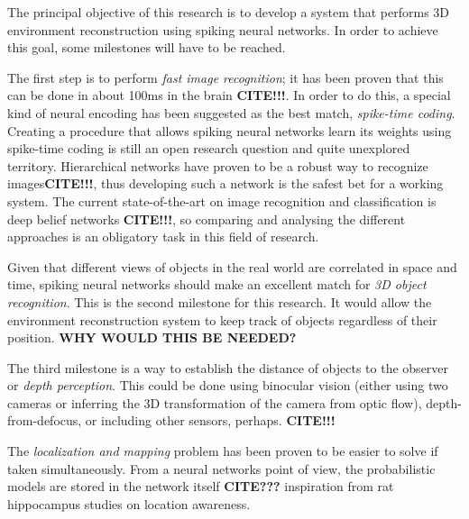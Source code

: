The principal objective of this research is to develop a system that performs 3D environment reconstruction using spiking neural networks. In order to achieve this goal, some milestones will have to be reached. 

The first step is to perform \emph{fast image recognition}; it has been proven that this can be done in about 100ms in the brain \textbf{CITE!!!}. In order to do this, a special kind of neural encoding has been suggested as the best match, \emph{spike-time coding}. Creating a procedure that allows spiking neural networks learn its weights using spike-time coding is still an open research question and quite unexplored territory. Hierarchical networks have proven to be a robust way to recognize images\textbf{CITE!!!}, thus developing such a network is the safest bet for a working system. The current state-of-the-art on image recognition and classification is deep belief networks \textbf{CITE!!!}, so comparing and analysing the different approaches is an obligatory task in this field of research. 

Given that different views of objects in the real world are correlated in space and time, spiking neural networks should make an excellent match for \emph{3D object recognition}. This is the second milestone for this research. It would allow the environment reconstruction system to keep track of objects regardless of their position. \textbf{WHY WOULD THIS BE NEEDED?}

The third milestone is a way to establish the distance of objects to the observer or \emph{depth perception}. This could be done using binocular vision (either using two cameras or inferring the 3D transformation of the camera from optic flow), depth-from-defocus, or including other sensors, perhaps. \textbf{CITE!!!}

The \emph{localization and mapping} problem has been proven to be easier to solve if taken simultaneously. From a neural networks point of view, the probabilistic models are stored in the network itself \textbf{CITE???} inspiration from rat hippocampus studies on location awareness.

